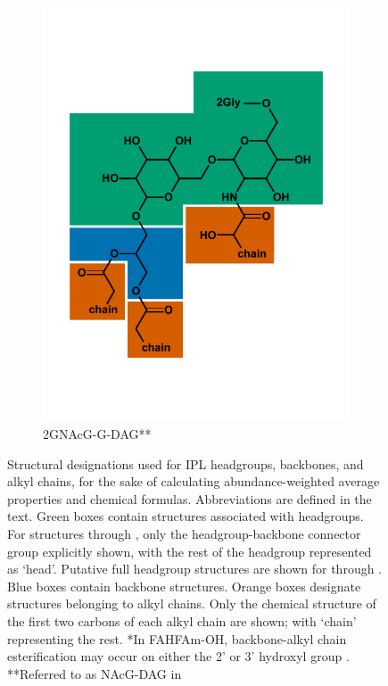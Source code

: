 {\begin{figure}[h]
\begin{subfigure}[b]{.45\linewidth}
        \includegraphics[width=\linewidth]{figs_ch1/2GNAcG-G-DAG}
    	\caption{2GNAcG-G-DAG**}
        \label{fig:2GNAcG-G-DAG}
    \end{subfigure}

    
\caption[Structural designations used for IPL headgroups, backbones, and alkyl chains]{Structural designations used for IPL headgroups, backbones, and alkyl chains, for the sake of calculating abundance-weighted average properties and chemical formulas. Abbreviations are defined in the text. Green boxes contain  structures associated with headgroups. For structures  through , only the headgroup-backbone connector group explicitly shown, with the rest of the headgroup represented as `head'. Putative full headgroup structures are shown for  through . Blue boxes contain backbone structures. Orange boxes designate structures belonging to alkyl chains. Only the chemical structure of the first two carbons of each alkyl chain are shown; with `chain' representing the rest. *In FAHFAm-OH, backbone-alkyl chain esterification may occur on either the 2' or 3' hydroxyl group \citep{diercks2015accumulation}. **Referred to as NAcG-DAG in \cite{schubotz2013spatial}}
\label{fig:IPLdivision}
\end{figure}
\doublespace
\clearpage
}


